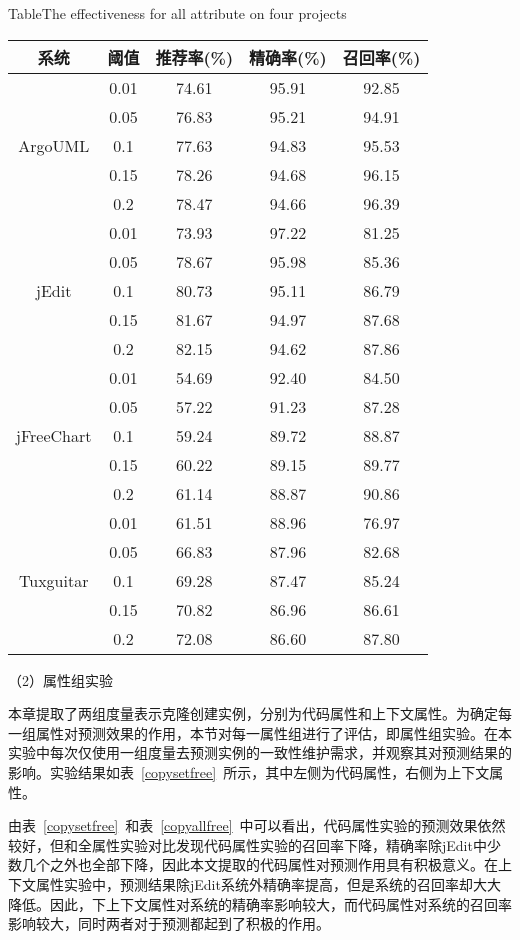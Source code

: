 \begin{table}[htbp]
{Table$\!$}{The effectiveness for all attribute on four projects}
\vspace{0.5em}
\centering
\wuhao
\begin{tabular}{ccccc}
\toprule[1.5pt]
{系统}&{阈值}&{推荐率(\%)}&{精确率(\%)}&{召回率(\%)}\\
\midrule[1pt]
\multirow{5}{*}{ArgoUML}
&0.01&	74.61&	95.91&	92.85\\
&0.05&	76.83&	95.21&	94.91\\
&0.1&	77.63&	94.83&	95.53\\
&0.15&  78.26&	94.68&	96.15\\
&0.2&	78.47&	94.66&	96.39\\
\hline
\multirow{5}{*}{jEdit}
&0.01&	73.93&	97.22&	81.25\\
&0.05&	78.67&	95.98&	85.36	\\
&0.1&	80.73&	95.11&	86.79	\\
&0.15&	81.67&	94.97&	87.68	\\
&0.2&	82.15&	94.62&	87.86	\\
\hline
\multirow{5}{*}{jFreeChart}
&0.01&	54.69&	92.40&	84.50\\
&0.05&	57.22&	91.23&	87.28\\
&0.1&	59.24&	89.72&	88.87\\
&0.15&	60.22&	89.15&	89.77\\
&0.2&	61.14&	88.87&	90.86\\
\hline
\multirow{5}{*}{Tuxguitar}
&0.01&	61.51&	88.96&	76.97\\
&0.05&	66.83&	87.96&	82.68\\
&0.1&	69.28&	87.47&	85.24\\
&0.15&	70.82&	86.96&	86.61\\
&0.2&	72.08&	86.60&	87.80\\
\bottomrule[1.5pt]
\end{tabular}
\end{table}

（2）属性组实验

本章提取了两组度量表示克隆创建实例，分别为代码属性和上下文属性。为确定每一组属性对预测效果的作用，本节对每一属性组进行了评估，即属性组实验。在本实验中每次仅使用一组度量去预测实例的一致性维护需求，并观察其对预测结果的影响。实验结果如表~\ref{copysetfree}~所示，其中左侧为代码属性，右侧为上下文属性。

由表~\ref{copysetfree}~和表~\ref{copyallfree}~中可以看出，代码属性实验的预测效果依然较好，但和全属性实验对比发现代码属性实验的召回率下降，精确率除jEdit中少数几个之外也全部下降，因此本文提取的代码属性对预测作用具有积极意义。在上下文属性实验中，预测结果除jEdit系统外精确率提高，但是系统的召回率却大大降低。因此，下上下文属性对系统的精确率影响较大，而代码属性对系统的召回率影响较大，同时两者对于预测都起到了积极的作用。

